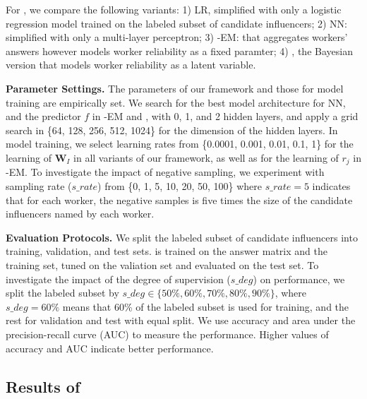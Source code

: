 For \sys, we compare the following variants: 1) LR, simplified \sys with only a logistic regression model trained on the labeled subset of candidate influencers; 2) NN: simplified \sys with only a multi-layer perceptron; 3) \sys-EM: \sys that aggregates workers' answers however models worker reliability as a fixed paramter; 4) \sys, the Bayesian version that models worker reliability as a latent variable.

\smallskip
\noindent\textbf{Parameter Settings.} The parameters of our framework and those for model training are empirically set. We search for the best model architecture for NN, and the predictor $f$ in \sys-EM and \sys, with 0, 1, and 2 hidden layers, and apply a grid search in \{64, 128, 256, 512, 1024\} for the dimension of the hidden layers. In model training, we select learning rates from \{0.0001, 0.001, 0.01, 0.1, 1\} for the learning of $\mathbf{W}_I$ in all variants of our framework, as well as for the learning of $r_j$ in \sys-EM. To investigate the impact of negative sampling, we experiment with sampling rate ($s\_rate$) from \{0, 1, 5, 10, 20, 50, 100\} where $s\_rate=5$ indicates that for each worker, the negative samples is five times the size of the candidate influencers named by each worker. 

\smallskip
\noindent\textbf{Evaluation Protocols.} We split the labeled subset of candidate influencers into training, validation, and test sets. \sys is trained on the answer matrix and the training set, tuned on the valiation set and evaluated on the test set. To investigate the impact of the degree of supervision ($s\_deg$) on \sys performance, we split the labeled subset by $s\_deg\in \{50\%, 60\%, 70\%, 80\%, 90\%\}$, where $s\_deg = 60\%$ means that 60\% of the labeled subset is used for training, and the rest for validation and test with equal split. We use accuracy and area under the precision-recall curve (AUC) to measure the performance. Higher values of accuracy and AUC indicate better performance.



\subsection{Results of \sys}
\label{sec:selfres}

